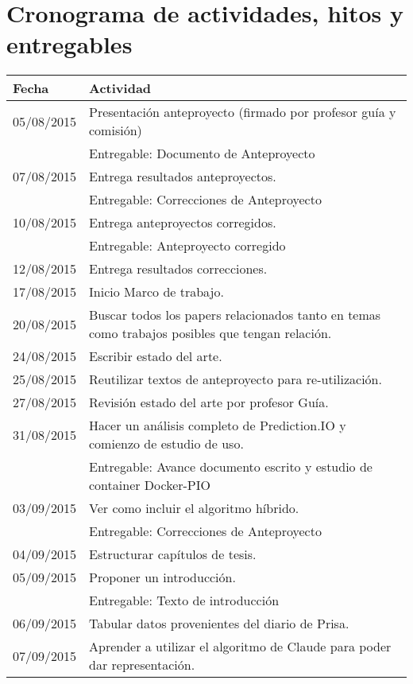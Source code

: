 \documentclass{udparticle}
\begin{document}
\section{Cronograma de actividades, hitos y entregables}
  \begin{center}
  	\begin{tabular}{ll}
  		\hline\noalign{\smallskip}
  		Fecha & Actividad  \\
  		\hline\noalign{\smallskip}
  		05/08/2015 & Presentación anteproyecto (firmado por profesor guía y comisión) \\
  		& Entregable: Documento de Anteproyecto \\
  		07/08/2015 & Entrega resultados anteproyectos. \\
  		& Entregable: Correcciones de Anteproyecto \\
  		10/08/2015 & Entrega anteproyectos corregidos. \\
  		& Entregable: Anteproyecto corregido \\
  		12/08/2015 & Entrega resultados correcciones. \\
  		17/08/2015 & Inicio Marco de trabajo. \\
  		20/08/2015 & Buscar todos los papers relacionados tanto en temas como trabajos posibles que tengan relación.\\
  		24/08/2015 & Escribir estado del arte. \\
  		25/08/2015 & Reutilizar textos de anteproyecto para re-utilización.\\
  		27/08/2015 & Revisión estado del arte por profesor Guía.\\
  		31/08/2015 & Hacer un análisis completo de Prediction.IO y comienzo de estudio de uso.\\
  		& Entregable: Avance documento escrito y estudio de container Docker-PIO \\
  		03/09/2015 & Ver como incluir el algoritmo híbrido.\\
  		& Entregable: Correcciones de Anteproyecto \\
  		04/09/2015 & Estructurar capítulos de tesis.\\
  		05/09/2015 & Proponer un introducción.\\
  		& Entregable: Texto de introducción \\
  		06/09/2015 & Tabular datos provenientes del diario de Prisa.\\
  		07/09/2015 & Aprender a utilizar el algoritmo de Claude para poder dar representación. \\

\end{tabular}
\end{center}
\end{document}
